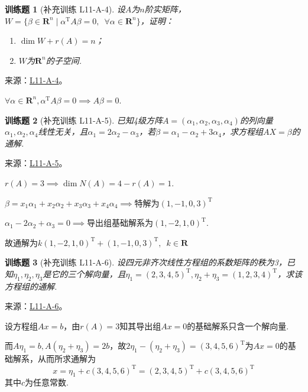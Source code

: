 \documentclass[12pt,fontset=fandol]{ctexart}
\newtheorem{exercise}{训练题}[section]
\begin{document}
\begin{exercise}[补充训练 L11-A-4]\label{prob:L11-A-4}
设$A$为$n$阶实矩阵，$W=\{\beta\in\mathbf{R}^n \mid \alpha^\mathrm{T}A\beta=0,\enspace \forall \alpha\in\mathbf{R}^n\}$，证明：
        \begin{enumerate}
            \item $\dim W+r(A)=n$；

            \item $W$为$\mathbf{R}^n$的子空间.
        \end{enumerate}
\end{exercise}
\noindent 来源：\href{https://github.com/yhwu-is/Linear-Algebra-Left-Undone/blob/new/%E8%AE%B2%E4%B9%89/%E4%B8%93%E9%A2%98/11%20%E6%9C%9D%E8%8A%B1%E5%A4%95%E6%8B%BE.tex}{L11-A-4}。
\begin{solve}
$\forall \alpha \in \mathbf{R}^n, \alpha^\mathrm{T}A\beta =0\implies A\beta =0$.
\end{solve}

\begin{exercise}[补充训练 L11-A-5]\label{prob:L11-A-5}
已知4级方阵$A=(\alpha_1,\alpha_2,\alpha_3,\alpha_4)$的列向量$\alpha_1,\alpha_2,\alpha_4$线性无关，且$\alpha_1=2\alpha_2-\alpha_3$，若$\beta=\alpha_1-\alpha_2+3\alpha_4$，求方程组$AX=\beta$的通解.
\end{exercise}
\noindent 来源：\href{https://github.com/yhwu-is/Linear-Algebra-Left-Undone/blob/new/%E8%AE%B2%E4%B9%89/%E4%B8%93%E9%A2%98/11%20%E6%9C%9D%E8%8A%B1%E5%A4%95%E6%8B%BE.tex}{L11-A-5}。
\begin{solve}
$r(A)=3\implies \dim{N(A)}=4-r(A)=1$.

          $\beta = x_1\alpha_1+x_2\alpha_2+x_3\alpha_3+x_4\alpha_4\implies$特解为$(1,-1,0,3)^\mathrm{T}$

          $\alpha_1-2\alpha_2+\alpha_3=0\implies$导出组基础解系为$(1,-2,1,0)^\mathrm{T}$.

          故通解为$k(1,-2,1,0)^\mathrm{T}+(1,-1,0,3)^\mathrm{T},\enspace k\in\mathbf{R}$
\end{solve}

\begin{exercise}[补充训练 L11-A-6]\label{prob:L11-A-6}
设四元非齐次线性方程组的系数矩阵的秩为3，已知$\eta_1,\eta_2,\eta_3$是它的三个解向量，且$\eta_1=(2,3,4,5)^\mathrm{T},\eta_2+\eta_3=(1,2,3,4)^\mathrm{T}$，求该方程组的通解.
\end{exercise}
\noindent 来源：\href{https://github.com/yhwu-is/Linear-Algebra-Left-Undone/blob/new/%E8%AE%B2%E4%B9%89/%E4%B8%93%E9%A2%98/11%20%E6%9C%9D%E8%8A%B1%E5%A4%95%E6%8B%BE.tex}{L11-A-6}。
\begin{solve}
设方程组$Ax=b$，由$r(A)=3$知其导出组$Ax=0$的基础解系只含一个解向量.

          而$A\eta_1=b,A(\eta_2+\eta_3)=2b$，故$2\eta_1-(\eta_2+\eta_3)=(3,4,5,6)^\mathrm{T}$为$Ax=0$的基础解系，从而所求通解为
          \[ x = \eta_1+c(3,4,5,6)^\mathrm{T} = (2,3,4,5)^\mathrm{T} + c(3,4,5,6)^\mathrm{T} \]
          其中$c$为任意常数.
\end{solve}
\end{document}

